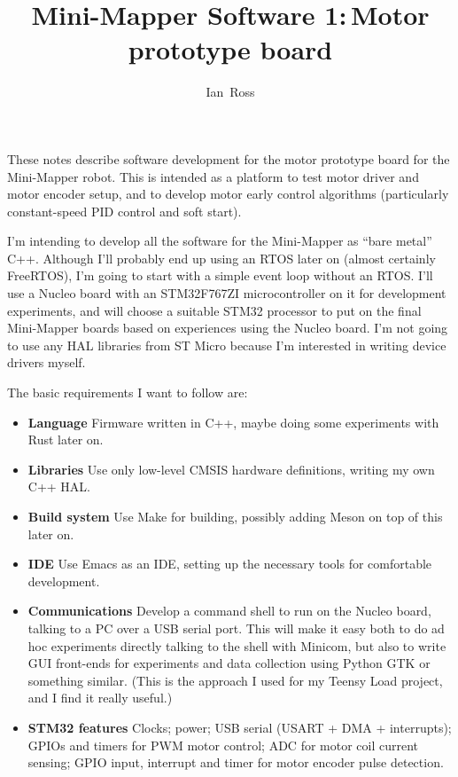 \documentclass[a4paper,11pt]{article}
\title{Mini-Mapper Software 1:\,Motor prototype board}
\author{Ian~Ross}
\begin{document}
\maketitle

These notes describe software development for the motor prototype
board for the Mini-Mapper robot. This is intended as a platform to
test motor driver and motor encoder setup, and to develop motor early
control algorithms (particularly constant-speed PID control and soft
start).

I'm intending to develop all the software for the Mini-Mapper as
``bare metal'' C++. Although I'll probably end up using an RTOS later
on (almost certainly FreeRTOS), I'm going to start with a simple event
loop without an RTOS. I'll use a Nucleo board with an STM32F767ZI
microcontroller on it for development experiments, and will choose a
suitable STM32 processor to put on the final Mini-Mapper boards based
on experiences using the Nucleo board. I'm not going to use any HAL
libraries from ST Micro because I'm interested in writing device
drivers myself.

The basic requirements I want to follow are:

\begin{itemize}
  \item{\textbf{Language} Firmware written in C++, maybe doing some
    experiments with Rust later on.}
  \item{\textbf{Libraries} Use only low-level CMSIS hardware
    definitions, writing my own C++ HAL.}
  \item{\textbf{Build system} Use Make for building, possibly adding
    Meson on top of this later on.}
  \item{\textbf{IDE} Use Emacs as an IDE, setting up the necessary
    tools for comfortable development.}
  \item{\textbf{Communications} Develop a command shell to run on the
    Nucleo board, talking to a PC over a USB serial port. This will
    make it easy both to do ad hoc experiments directly talking to the
    shell with Minicom, but also to write GUI front-ends for
    experiments and data collection using Python GTK or something
    similar. (This is the approach I used for my Teensy Load project,
    and I find it really useful.)}
  \item{\textbf{STM32 features} Clocks; power; USB serial (USART + DMA
    + interrupts); GPIOs and timers for PWM motor control; ADC for
    motor coil current sensing; GPIO input, interrupt and timer for
    motor encoder pulse detection.}
\end{itemize}
\end{document}
